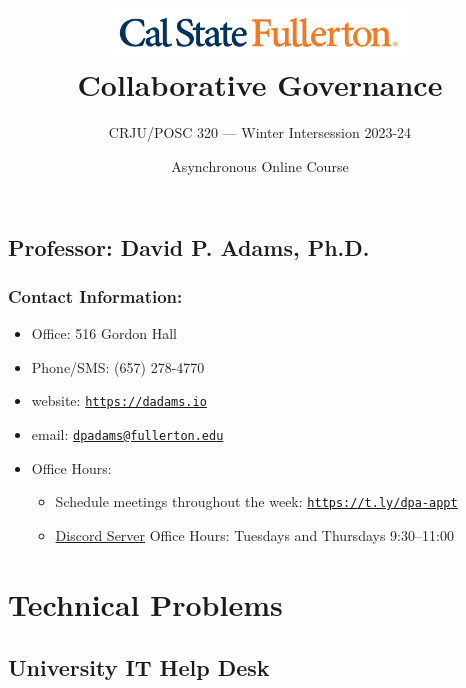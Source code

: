 \documentclass[12pt, letterpaper]{article}
\begin{document}
\title{\includegraphics[width=8cm]{csuf_logo.png} \\ \textbf{Collaborative Governance}}

\author{CRJU/POSC 320 — Winter Intersession 2023-24}
\date{Asynchronous Online Course}

    \maketitle


\subsection*{Professor: David P. Adams, Ph.D.}

\subsubsection*{Contact Information:}

\begin{itemize}
	\item Office: 516 Gordon Hall
	\item Phone/SMS: (657) 278-4770
	\item website: \href{https://dadams.io}{\texttt{https://dadams.io}}
	\item email: \href{dpadams@fullerton.edu}{\texttt{dpadams@fullerton.edu}}
	\item Office Hours:
        \begin{itemize}
            \item Schedule meetings throughout the week: \href{https://t.ly/dpa-appt}{\texttt{https://t.ly/dpa-appt}}
            \item \href{https://discord.gg/pKjbtWydxm}{Discord Server} Office Hours: Tuesdays and Thursdays 9:30--11:00
        \end{itemize}
\end{itemize}


\section*{Technical Problems}

\subsection*{University IT Help Desk}
\end{document}
